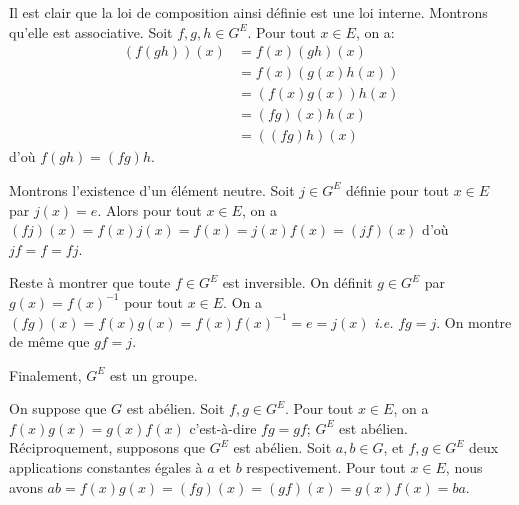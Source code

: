 Il est clair que la loi de composition ainsi définie est une loi interne.
Montrons qu'elle est associative. Soit $f,g,h\in G^E$. Pour tout $x\in E$, on
a:
%
\begin{align*}
  (f(gh))(x) &= f(x)(gh)(x) \\
             &= f(x)(g(x)h(x)) \\
             &= (f(x)g(x))h(x) \\
             &= (fg)(x)h(x) \\
             &= ((fg)h)(x)
\end{align*}
%
d'où $f(gh) = (fg)h$.

Montrons l'existence d'un élément neutre.  Soit $j\in G^E$ définie pour tout
$x\in E$ par $j(x)=e$. Alors pour tout $x\in E$, on a $(fj)(x) = f(x)j(x) =
f(x) = j(x)f(x) = (jf)(x)$ d'où  $jf = f = fj$.

Reste à montrer que toute $f\in G^E$ est inversible. On définit $g\in G^E$ par
$g(x) = f(x)^{-1}$ pour tout $x\in E$. On a $(fg)(x) = f(x)g(x) = f(x)f(x)^{-1}
= e = j(x)$ \textit{i.e.} $fg = j$. On montre de même que $gf = j$.

Finalement, $G^E$ est un groupe.

On suppose que $G$ est abélien. Soit $f,g\in G^E$. Pour tout $x\in E$, on a
$f(x)g(x) = g(x)f(x)$ c'est-à-dire $fg = gf$; $G^E$ est abélien. Réciproquement,
supposons que $G^E$ est abélien. Soit $a,b\in G$, et $f,g\in G^E$ deux
applications constantes égales à $a$ et $b$ respectivement. Pour tout $x\in E$,
nous avons $ab = f(x)g(x) = (fg)(x) = (gf)(x) = g(x)f(x) = ba$.
